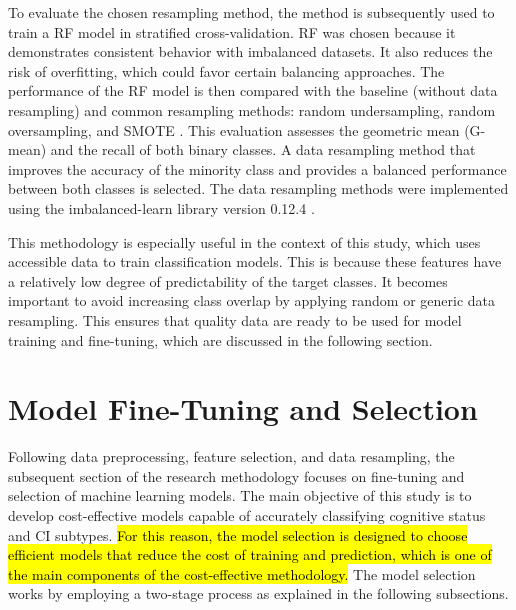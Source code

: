 To evaluate the chosen resampling method, the method is subsequently used to train a RF model in stratified cross-validation. RF was chosen because it demonstrates consistent behavior with imbalanced datasets. It also reduces the risk of overfitting, which could favor certain balancing approaches. The performance of the RF model is then compared with the baseline (without data resampling) and common resampling methods: random undersampling, random oversampling, and SMOTE \cite{Chawla2002SMOTE}. This evaluation assesses the geometric mean (\acrshort{G-mean}) and the recall of both binary classes. A data resampling method that improves the accuracy of the minority class and provides a balanced performance between both classes is selected. The data resampling methods were implemented using the imbalanced-learn library version 0.12.4 \cite{Lematre2016Imbalanced-learn}.


This methodology is especially useful in the context of this study, which uses accessible data to train classification models. This is because these features have a relatively low degree of predictability of the target classes. It becomes important to avoid increasing class overlap by applying random or generic data resampling. This ensures that quality data are ready to be used for model training and fine-tuning, which are discussed in the following section.

\section{Model Fine-Tuning and Selection}
Following data preprocessing, feature selection, and data resampling, the subsequent section of the research methodology focuses on fine-tuning and selection of machine learning models. The main objective of this study is to develop cost-effective models capable of accurately classifying cognitive status and CI subtypes. \hl{For this reason, the model selection is designed to choose efficient models that reduce the cost of training and prediction, which is one of the main components of the cost-effective methodology.} The model selection works by employing a two-stage process as explained in the following subsections.

